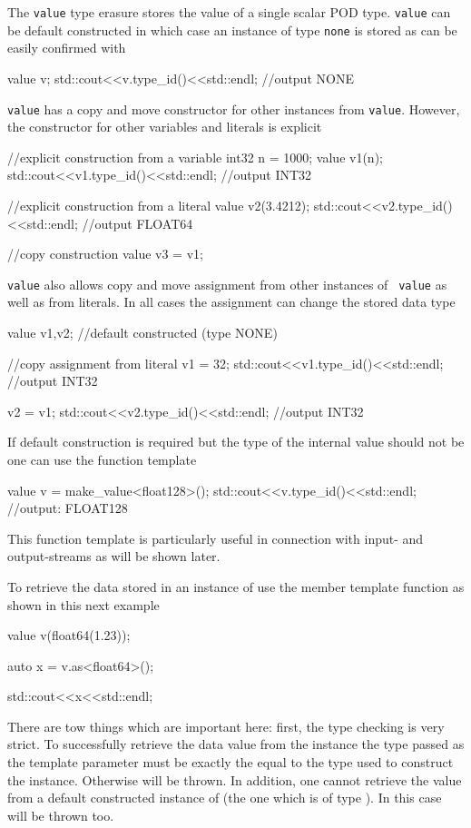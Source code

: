 The {\tt value} type erasure stores the value of a single scalar POD type. 
{\tt value} can be default constructed in which case an instance of type 
{\tt none} is stored as can be easily confirmed with
\begin{cppcode}
value v;
std::cout<<v.type_id()<<std::endl; //output NONE
\end{cppcode}
{\tt value} has a copy and move constructor for other instances from 
{\tt value}. However, the constructor for other variables and literals is 
explicit 
\begin{cppcode}
//explicit construction from a variable
int32 n = 1000;
value v1(n);     
std::cout<<v1.type_id()<<std::endl; //output INT32

//explicit construction from a literal
value v2(3.4212); 
std::cout<<v2.type_id()<<std::endl; //output FLOAT64

//copy construction
value v3 = v1;
\end{cppcode}
{\tt value} also allows copy and move assignment from other instances of {\tt
value} as well as from literals. In all cases the assignment can change the
stored data type
\begin{cppcode}
value v1,v2;  //default constructed  (type NONE)

//copy assignment from literal
v1 = 32;  
std::cout<<v1.type_id()<<std::endl;  //output INT32

v2 = v1;
std::cout<<v2.type_id()<<std::endl;  //output INT32
\end{cppcode}
If default construction is required but the type of the internal value should
not be  one can use the  function template 
\begin{cppcode}
value v = make_value<float128>();
std::cout<<v.type_id()<<std::endl; //output: FLOAT128
\end{cppcode}
This function template is particularly useful in connection with input- and
output-streams as will be shown later. 

To retrieve the data stored in an instance of  use the 
member template function as shown in this next example
\begin{cppcode}
value v(float64(1.23));

auto x = v.as<float64>();

std::cout<<x<<std::endl;
\end{cppcode}
There are tow things which are important here: first, the type checking is very
strict. To successfully retrieve the data value from the  instance
the type passed as the template parameter must be exactly the equal to the type
used to construct the  instance. Otherwise  will be
thrown. In addition, one cannot retrieve the value from a default constructed
instance of  (the one which is of type ). In this case 
 will be thrown too.

